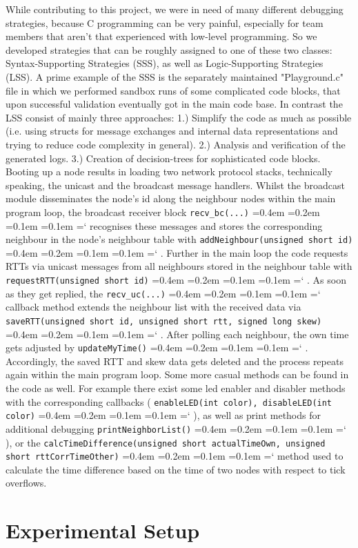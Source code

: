 \documentclass{llncs}
\newcommand{\code}[1]{%
	\texttt{#1}%
	\fontdimen2\font=0.4em
	\fontdimen3\font=0.2em
	\fontdimen4\font=0.1em
	\fontdimen7\font=0.1em
	\hyphenchar\font=`\-
}
\begin{document}
\noindent While contributing to this project, we were in need of many different debugging strategies, because C programming can be very painful, especially for team members that aren't that experienced with low-level programming.
So we developed strategies that can be roughly assigned to one of these two classes: Syntax-Supporting Strategies (SSS), as well as Logic-Supporting Strategies (LSS). 
A prime example of the SSS is the separately maintained "Playground.c" file in which we performed sandbox runs of some complicated code blocks, that upon successful validation eventually got in the main code base.
In contrast the LSS consist of mainly three approaches: 1.) Simplify the code as much as possible (i.e. using structs for message exchanges and internal data representations and trying to reduce code complexity in general). 2.) Analysis and verification of the generated logs. 3.) Creation of decision-trees for sophisticated code blocks.\\
Booting up a node results in loading two network protocol stacks, technically speaking, the unicast and the broadcast message handlers. Whilst the broadcast module disseminates the node's id along the neighbour nodes within the main program loop, the broadcast receiver block \code{recv\_bc(...)} recognises these messages and stores the corresponding neighbour in the node's neighbour table with \code{addNeighbour(unsigned short id)}. Further in the main loop the code requests RTTs via unicast messages from all neighbours stored in the neighbour table with \code{requestRTT(unsigned short id)}. As soon as they get replied, the \code{recv\_uc(...)} callback method extends the neighbour list with the received data via \code{saveRTT(unsigned short id, unsigned short rtt, signed long skew)}.
After polling each neighbour, the own time gets adjusted by \code{updateMyTime()}. Accordingly, the saved RTT and skew data gets deleted and the process repeats again within the main program loop.
Some more casual methods can be found in the code as well. For example there exist some led enabler and disabler methods with the corresponding callbacks (\code{enableLED(int color), disableLED(int color)}), as well as print methods for additional debugging \code{print\-Neighbor\-List()}), or the \code{calcTimeDifference(unsigned short actualTimeOwn, un\-sign\-ed short rttCorrTimeOther)} method used to calculate the time difference based on the time of two nodes with respect to tick overflows.

\section{Experimental Setup}
\end{document}
